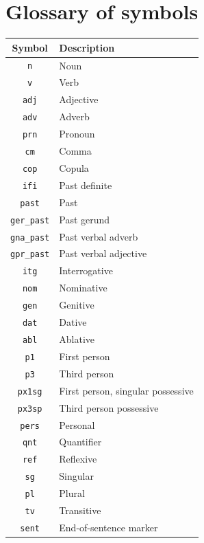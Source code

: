\documentclass[a4paper,11pt,twocolumn]{article}
\newcommand{\tags}[1]{\texttt{#1}}
\begin{document}
\section{Glossary of symbols}
\label{app:glossary}
\centering
\begin{tabular}{cl}
\toprule
 \textbf{Symbol} & \textbf{Description}\\
\midrule
 \tags{n} & Noun  \\
 \tags{v} & Verb  \\
 \tags{adj} & Adjective  \\
 \tags{adv} & Adverb  \\
 \tags{prn} & Pronoun  \\
 \tags{cm} &  Comma \\
 \tags{cop} & Copula  \\
 \tags{ifi} & Past definite  \\
 \tags{past} & Past  \\
 \tags{ger\_past} & Past gerund \\
 \tags{gna\_past} & Past verbal adverb  \\
 \tags{gpr\_past} & Past verbal adjective  \\
 \tags{itg} & Interrogative  \\
 \tags{nom} & Nominative \\
 \tags{gen} & Genitive  \\
 \tags{dat} & Dative  \\
 \tags{abl} & Ablative \\
 \tags{p1} & First person  \\
 \tags{p3} & Third person  \\
 \tags{px1sg} & First person, singular possessive  \\
 \tags{px3sp} & Third person possessive  \\
 \tags{pers} & Personal  \\
 \tags{qnt} & Quantifier  \\
 \tags{ref} & Reflexive  \\
 \tags{sg} & Singular  \\
 \tags{pl} &  Plural \\
 \tags{tv} & Transitive  \\
 \tags{sent} & End-of-sentence marker  \\

\bottomrule

\end{tabular}
\end{document}
